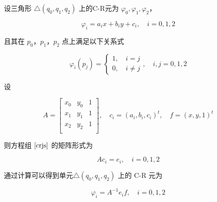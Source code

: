 \documentclass[a4paper,UTF8,titlepage]{ctexart}
\begin{document}
设三角形 $\bigtriangleup(q_0,q_1,q_2)$ 上的C-R元为 $\varphi_0, \varphi_1,\varphi_2$，

\begin{equation}
\varphi_i = a_i x + b_i y + c_i, \quad i = 0,1,2
\end{equation}

且其在 $p_0$，$p_1$，$p_2$ 点上满足以下关系式

\begin{equation}
\varphi_i(p_j) = \begin{cases}
	1, \quad i = j \\
	0, \quad i \ne j	
\end{cases}, \quad i, j = 0,1,2
\label{crjs}
\end{equation}

设

$$
A = \begin{bmatrix}
	x_0 & y_0 &1 \\
	x_1 & y_1 &1 \\
	x_2 & y_2 &1 \\
\end{bmatrix}, \quad 
c_i = (a_i,b_i,c_i)^t , \quad
f = (x,y,1)^t
$$

则方程组 $\eqref{crjs}$ 的矩阵形式为

\begin{equation}
A c_i = e_i, \quad i = 0,1,2
\end{equation}

通过计算可以得到单元$\bigtriangleup(q_0, q_1, q_2)$ 上的 C-R 元为

\begin{equation}
\varphi_i = A^{-1} e_i f, \quad i = 0,1,2
\end{equation} 

\end{document}
